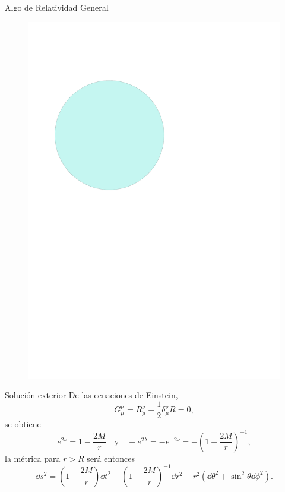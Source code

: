 \documentclass[11pt]{beamer}
\begin{document}
\begin{frame}{Algo de Relatividad General}
    \begin{figure}
        \centering
        \includegraphics[page=4,scale=0.65]{GR.pdf}
    \end{figure}
\end{frame}

\begin{frame}{Solución exterior}
    De las ecuaciones de Einstein,
    \begin{equation}
        G _ { \mu } ^ { \nu } = R _ { \mu } ^ { \nu } - \frac { 1 } { 2 } \delta _ { \mu } ^ { \nu } R = 0,
    \end{equation}
    se obtiene
    \begin{equation}
        e ^ { 2 \nu } = 1 - \frac { 2 M } { r }\quad \text{y}\quad - e ^ { 2 \lambda } = - e ^ { - 2 \nu } = - \left( 1 - \frac { 2 M } { r } \right) ^ { - 1 },
    \end{equation}
    la métrica para $r>R$ será entonces
    \begin{equation}
        \dd{s} ^ { 2 } =  \left( 1 - \frac { 2 M } { r } \right) \dd{t} ^ { 2 } - \left( 1 - \frac { 2 M } { r } \right) ^ { - 1 } \dd{r} ^ { 2 }  - r ^ { 2 }\left( \dd{\theta} ^ { 2 } +  \sin ^ { 2 } \theta \dd{\phi} ^ { 2 } \right).
    \end{equation}
    
\end{frame}
\end{document}
